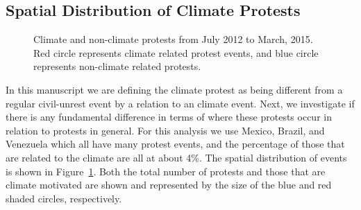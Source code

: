 \subsection{Spatial Distribution of Climate Protests}
\begin{figure}[t]
	\centering
	\caption{Climate and non-climate protests from July 2012 to March, 2015. Red circle represents climate related protest events, and blue circle represents non-climate related protests. }
\label{climate-map}
\end{figure}

In this manuscript we are defining the climate protest as being different from a regular civil-unrest event by a relation to an climate event.
Next, we investigate if there is any fundamental difference in terms of where these protests occur in relation to protests in general.
For this analysis we use Mexico, Brazil, and Venezuela which all have many protest events, and the percentage of those that are related to the climate are all at about 4\%.
The spatial distribution of events is shown in  Figure~\ref{climate-map}.
Both the total number of protests and those that are climate motivated are shown and represented by the size of the blue and red shaded circles, respectively.

